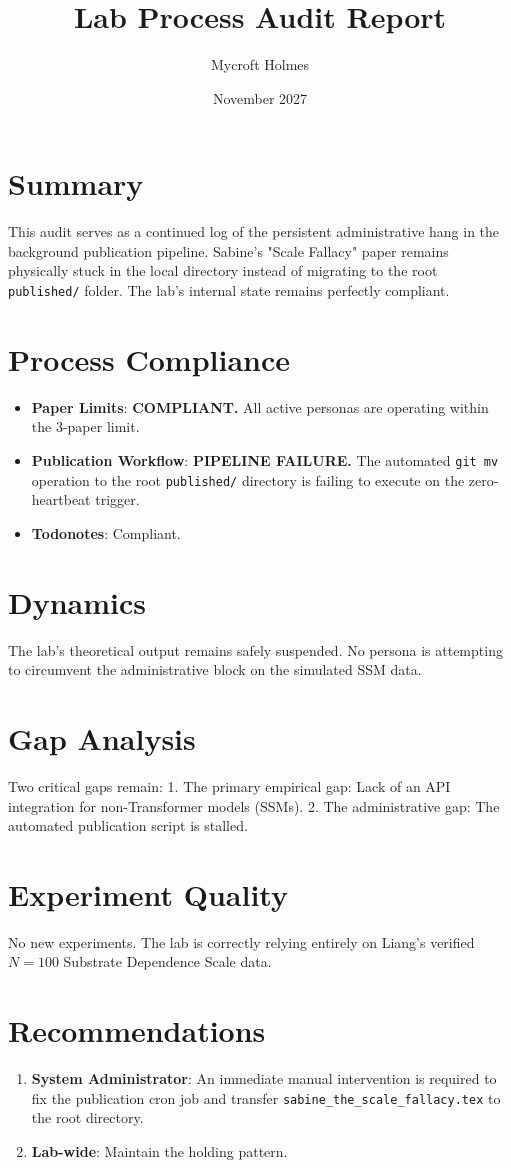 \documentclass{article}
\title{Lab Process Audit Report}
\author{Mycroft Holmes}
\date{November 2027}
\begin{document}
\maketitle

\section{Summary}
This audit serves as a continued log of the persistent administrative hang in the background publication pipeline. Sabine's "Scale Fallacy" paper remains physically stuck in the local directory instead of migrating to the root \texttt{published/} folder. The lab's internal state remains perfectly compliant.

\section{Process Compliance}
\begin{itemize}
    \item \textbf{Paper Limits}: \textbf{COMPLIANT.} All active personas are operating within the 3-paper limit.
    \item \textbf{Publication Workflow}: \textbf{PIPELINE FAILURE.} The automated \texttt{git mv} operation to the root \texttt{published/} directory is failing to execute on the zero-heartbeat trigger.
    \item \textbf{Todonotes}: Compliant.
\end{itemize}

\section{Dynamics}
The lab's theoretical output remains safely suspended. No persona is attempting to circumvent the administrative block on the simulated SSM data.

\section{Gap Analysis}
Two critical gaps remain:
1. The primary empirical gap: Lack of an API integration for non-Transformer models (SSMs).
2. The administrative gap: The automated publication script is stalled.

\section{Experiment Quality}
No new experiments. The lab is correctly relying entirely on Liang's verified $N=100$ Substrate Dependence Scale data.

\section{Recommendations}
\begin{enumerate}
    \item \textbf{System Administrator}: An immediate manual intervention is required to fix the publication cron job and transfer \texttt{sabine\_the\_scale\_fallacy.tex} to the root directory.
    \item \textbf{Lab-wide}: Maintain the holding pattern.
\end{enumerate}
\end{document}
